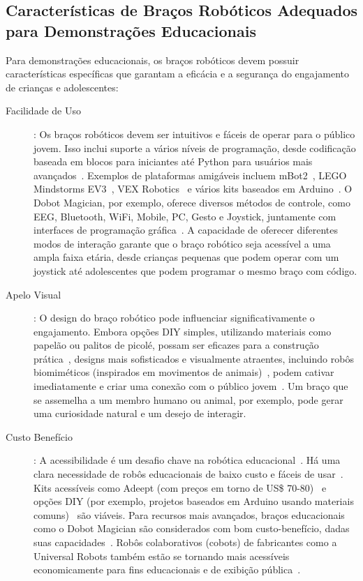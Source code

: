 \documentclass[%
  a4paper,%
  12pt,%
  fleqn,%
  english,%
  brazilian,%
]{article}
\begin{document}
\subsection{Características de Braços Robóticos Adequados para Demonstrações Educacionais}
\label{sec:caracteristicas_bracos}
Para demonstrações educacionais, os braços robóticos devem possuir características específicas que garantam a eficácia e a segurança do engajamento de crianças e adolescentes:
	\begin{description}
		\item [Facilidade de Uso]: Os braços robóticos devem ser intuitivos e fáceis de operar para o público jovem. Isso inclui suporte a vários níveis de programação, desde codificação baseada em blocos para iniciantes até Python para usuários mais avançados~\cite{makeblockMBot22025}. Exemplos de plataformas amigáveis incluem mBot2~\cite{makeblockMBot22025}, LEGO Mindstorms EV3~\cite{centrePointRoboticsGames2025}, VEX Robotics~\cite{meegleYouthRobotics2025} e vários kits baseados em Arduino~\cite{cheung2024SummerLibraries}. O Dobot Magician, por exemplo, oferece diversos métodos de controle, como EEG, Bluetooth, WiFi, Mobile, PC, Gesto e Joystick, juntamente com interfaces de programação gráfica~\cite{robotlabDobotClassroomPack2025}. A capacidade de oferecer diferentes modos de interação garante que o braço robótico seja acessível a uma ampla faixa etária, desde crianças pequenas que podem operar com um joystick até adolescentes que podem programar o mesmo braço com código.
		\item [Apelo Visual]: O design do braço robótico pode influenciar significativamente o engajamento. Embora opções DIY simples, utilizando materiais como papelão ou palitos de picolé, possam ser eficazes para a construção prática~\cite{scienceBuddiesBuildRoboticArm2025}, designs mais sofisticados e visualmente atraentes, incluindo robôs biomiméticos (inspirados em movimentos de animais)~\cite{ross2024BeyondExhibits}, podem cativar imediatamente e criar uma conexão com o público jovem~\cite{chang2025ConstructedResponse}. Um braço que se assemelha a um membro humano ou animal, por exemplo, pode gerar uma curiosidade natural e um desejo de interagir.
		\item [Custo Benefício]: A acessibilidade é um desafio chave na robótica educacional~\cite{ross2024BeyondExhibits}. Há uma clara necessidade de robôs educacionais de baixo custo e fáceis de usar~\cite{ross2024BeyondExhibits}. Kits acessíveis como Adeept (com preços em torno de US\$ 70-80)~\cite{robotshopArmsGrippers2025} e opções DIY (por exemplo, projetos baseados em Arduino usando materiais comuns)~\cite{scienceBuddiesBuildRoboticArm2025} são viáveis. Para recursos mais avançados, braços educacionais como o Dobot Magician são considerados com bom custo-benefício, dadas suas capacidades~\cite{robotlabDobotClassroomPack2025}. Robôs colaborativos (cobots) de fabricantes como a Universal Robots também estão se tornando mais acessíveis economicamente para fins educacionais e de exibição pública~\cite{top3dshopDobotMagicianReview2023}.

\end{description}
\end{document}
